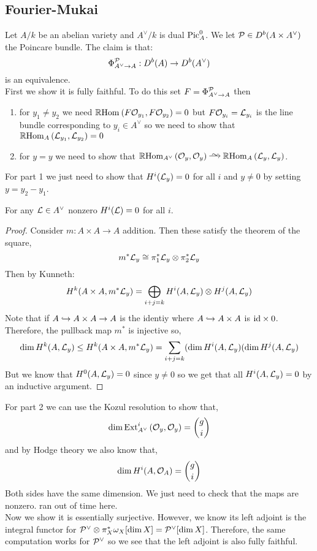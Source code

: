 \documentclass[12pt]{article}
\begin{document}
\subsection{Fourier-Mukai}

Let $A/k$ be an abelian variety and $A^{\vee} / k$ is dual $\mathrm{Pic}^0_A$. We let $\mathcal{P} \in D^b(A \times A^\vee)$ the Poincare bundle. The claim is that:
\[ \Phi^{\mathcal{P}}_{A^\vee \to A} : D^b(A) \to D^b(A^\vee) \]
is an equivalence. 
\bigskip\\
First we show it is fully faithful. To do this set $F = \Phi^{\mathcal{P}}_{A^\vee \to A}$ then
\begin{enumerate}
\item for $y_1 \neq y_2$ we need $\mathbb{R}\mathrm{Hom}_{} \left( F \mathcal{O}_{y_1}, F \mathcal{O}_{y_2} \right) = 0$ but $F \mathcal{O}_{y_i} = \mathcal{L}_{y_i}$ is the line bundle corresponding to $y_i \in A^\vee$ so we need to show that $\mathbb{R}\mathrm{Hom}_{A} \left( \mathcal{L}_{y_1}, \mathcal{L}_{y_2} \right) = 0$
\item for $y = y$ we need to show that $\RR \Hom{A^\vee}{\struct{y}}{\struct{y}} \iso \RR \Hom{A}{\L_y}{\L_y}$.
\end{enumerate}

For part 1 we just need to show that $H^i(\mathcal{L}_y) = 0$ for all $i$ and $y \neq 0$ by setting $y = y_2 - y_1$. 

\begin{lemma}[Mumford]
For any $\mathcal{L} \in A^\vee$ nonzero $H^i(\mathcal{L}) = 0$ for all $i$.
\end{lemma}

\begin{proof}
Consider $m : A \times A \to A$ addition. Then these satisfy the theorem of the square,
\[ m^* \mathcal{L}_y \cong \pi_1^* \mathcal{L}_y \otimes \pi_2^* \mathcal{L}_y \]
Then by Kunneth:
\[ H^k(A \times A, m^* \mathcal{L}_y) = \bigoplus_{i + j = k} H^i(A, \mathcal{L}_y) \otimes H^j(A, \mathcal{L}_y) \]
Note that if $A \hookrightarrow A \times A \to A$ is the identiy where $A \hookrightarrow A \times A$ is $\mathrm{id} \times 0$. Therefore, the pullback map $m^*$ is injective so,
\[ \dim H^k(A, \mathcal{L}_y) \le H^k(A \times A, m^* \mathcal{L}_y) = \sum_{i + j = k} (\dim H^i(A, \mathcal{L}_y) (\dim H^j(A, \mathcal{L}_y) \]
But we know that $H^0(A, \mathcal{L}_y) = 0$ since $y \neq 0$ so we get that all $H^i(A, \mathcal{L}_y) = 0$ by an inductive argument. 
\end{proof}

For part 2 we can use the Kozul resolution to show that,
\[ \dim \mathrm{Ext}^{i}_{A^\vee} \left( \mathcal{O}_{y}, \mathcal{O}_{y} \right) = {g \choose i} \]
and by Hodge theory we also know that,
\[ \dim H^i(A, \mathcal{O}_{A}) = {g \choose i} \]
Both sides have the same dimension. We just need to check that the maps are nonzero. {\color{red} ran out of time here}.
\bigskip\\
Now we show it is essentially surjective. However, we know its left adjoint is the integral functor for $\mathcal{P}^{\vee} \otimes \pi_X^* \omega_X[\dim{X}] = \mathcal{P}^{\vee}[\dim{X}]$. Therefore, the same computation works for $\mathcal{P}^\vee$ so we see that the left adjoint is also fully faithful. 
\end{document}
